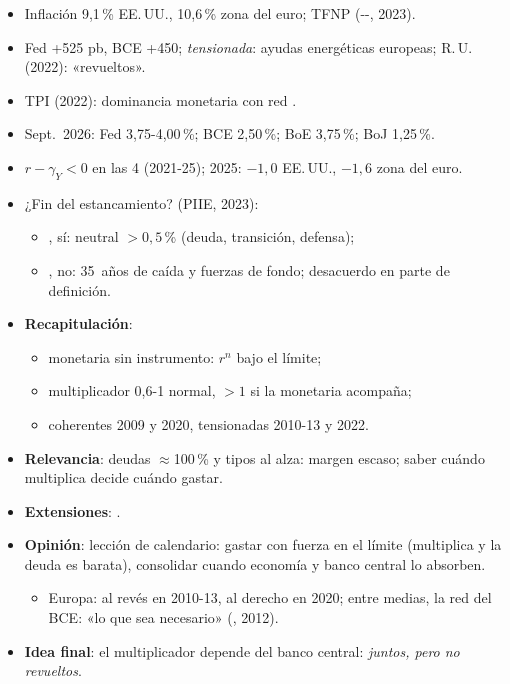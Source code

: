 \documentclass{article}
\begin{document}
\begin{columnas}
\begin{itemize}
\item Inflación 9,1\,\% EE.\,UU., 10,6\,\% zona del euro; TFNP (--, 2023).
\item Fed +525 pb, BCE +450; \emph{tensionada}: ayudas energéticas europeas; R.\,U. (2022): «revueltos».
\item TPI (2022): dominancia monetaria con red .
\item Sept.\ 2026: Fed 3,75-4,00\,\%; BCE 2,50\,\%; BoE 3,75\,\%; BoJ 1,25\,\%.
\item $r-\gamma_Y<0$ en las 4 (2021-25); 2025: $-1{,}0$ EE.\,UU., $-1{,}6$ zona del euro.
\item ¿Fin del estancamiento? (PIIE, 2023):
  \begin{itemize}
  \item {}, sí: neutral $>0{,}5$\,\% (deuda, transición, defensa);
  \item {}, no: 35~años de caída y fuerzas de fondo; desacuerdo en parte de definición.
  \end{itemize}
\end{itemize}

\begin{itemize}
\item \textbf{Recapitulación}:
  \begin{itemize}
  \item monetaria sin instrumento: $r^n$ bajo el límite;
  \item multiplicador 0,6-1 normal, $>1$ si la monetaria acompaña;
  \item coherentes 2009 y 2020, tensionadas 2010-13 y 2022.
  \end{itemize}
\item \textbf{Relevancia}: deudas $\approx$100\,\% y tipos al alza: margen escaso; saber cuándo multiplica decide cuándo gastar.
\item \textbf{Extensiones}:      .
\item \textbf{Opinión}: lección de calendario: gastar con fuerza en el límite (multiplica y la deuda es barata), consolidar cuando economía y banco central lo absorben.
  \begin{itemize}
  \item Europa: al revés en 2010-13, al derecho en 2020; entre medias, la red del BCE: «lo que sea necesario» (, 2012).
  \end{itemize}
\item \textbf{Idea final}: el multiplicador depende del banco central: \emph{juntos, pero no revueltos}.
\end{itemize}


\end{columnas}
\end{document}
